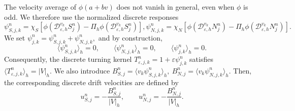 \documentclass[11pt,twoside]{article}
\numberwithin{equation}{section}
\theoremstyle{plain}
\theoremstyle{nonumberplain}
\begin{document}
{{The velocity average of \(\phi(a+bv)\) does not vanish in general, even
when \(\phi\) is odd. We therefore use the normalized discrete responses
\[
\psi_{S,j,k}^n
=\chi_S\left[
\phi\!\left(\mathcal D_{\varepsilon,h}^{v_k}S_j^n\right)
-\Pi_h\phi\!\left(\mathcal D_{\varepsilon,h}^{v_k}S_j^n\right)
\right],
\psi_{N,j,k}^n
=\chi_N\left[
\phi\!\left(\mathcal D_{\varepsilon,h}^{v_k}N_j^n\right)
-\Pi_h\phi\!\left(\mathcal D_{\varepsilon,h}^{v_k}N_j^n\right)
\right].
\]
We set
$\psi_{j,k}^n
=
\psi_{S,j,k}^n+\psi_{N,j,k}^n ,$
and by construction,
\[
\langle \psi_{S,j,k}^n\rangle_h=0,
\qquad
\langle \psi_{N,j,k}^n\rangle_h=0,
\qquad
\langle \psi_{j,k}^n\rangle_h=0.
\]
Consequently, the discrete turning kernel $
T_{\varepsilon,j,k}^n
=
1+\varepsilon \psi_{j,k}^n$
satisfies
$
\langle T_{\varepsilon,j,k}^n\rangle_h=|V|_h.$
We also introduce
$
B_{S,j}^n
=
\langle v_k\psi_{S,j,k}^n\rangle_h,
\
B_{N,j}^n
=
\langle v_k\psi_{N,j,k}^n\rangle_h.
$
Then, the corresponding discrete drift velocities are defined by
\[
u_{S,j}^n
=
-\frac{B_{S,j}^n}{|V|_h},
\qquad
u_{N,j}^n
=
-\frac{B_{N,j}^n}{|V|_h}.
\]

}}
\end{document}
